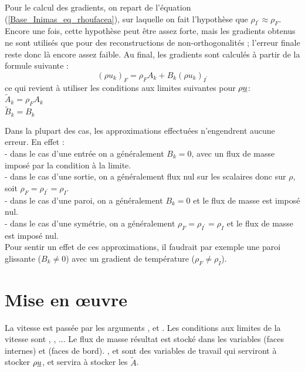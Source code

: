 Pour le calcul des gradients, on repart de l'équation (\ref{Base_Inimas_eq_rhoufacea}), sur
laquelle on fait l'hypothèse que $\rho_{I^\prime}\approx\rho_F$. Encore une
fois, cette hypothèse peut être assez forte, mais les gradients obtenus ne
sont utilisés que pour des reconstructions de non-orthogonalités ; l'erreur
finale reste donc là encore assez faible.
Au final, les gradients sont calculés à partir de la formule suivante :
\begin{equation}
(\rho u_k)_F = \rho_F A_k + B_k(\rho u_k)_{I^\prime}
\end{equation}
ce qui revient à utiliser les conditions aux limites suivantes pour
$\rho \underline{u}$:\\
$\tilde{A}_k = \rho_F A_k$\\
$\tilde{B}_k = B_k$


Dans la plupart des cas, les approximations effectuées n'engendrent aucune
erreur. En effet :\\
- dans le cas d'une entrée on a généralement $B_k=0$, avec un flux de
masse imposé par la condition à la limite.\\
- dans le cas d'une sortie, on a généralement flux nul sur les scalaires
donc sur $\rho$, soit \mbox{$\rho_F=\rho_{I^\prime}=\rho_I$}.\\
- dans le cas d'une paroi, on a généralement $B_k=0$ et le flux de masse
est imposé nul.\\
- dans le cas d'une symétrie, on a généralement
$\rho_F=\rho_{I^\prime}=\rho_I$ et le flux de masse est imposé nul.\\
Pour sentir un effet de ces approximations, il faudrait par exemple une paroi
glissante ($B_k\ne0$) avec un gradient de température ($\rho_F\ne\rho_I$).

\section*{Mise en \oe uvre}

La vitesse est passée par les arguments ,  et . Les
conditions aux limites de la vitesse sont , , ... Le
flux de masse résultat est stocké dans les variables  (faces
internes) et  (faces de bord). ,  et 
sont des variables de travail qui serviront à stocker $\rho\underline{u}$, et
 servira à stocker les $\tilde{A}$.

